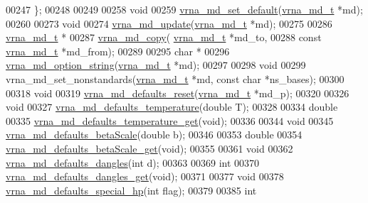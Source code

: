 \begin{DoxyCode}
00247 \};
00248 
00249 
00258 \textcolor{keywordtype}{void}
00259 \hyperlink{group__model__details_ga8ac6ff84936282436f822644bf841f66}{vrna\_md\_set\_default}(\hyperlink{structvrna__md__s}{vrna\_md\_t} *md);
00260 
00273 \textcolor{keywordtype}{void}
00274 \hyperlink{group__model__details_ga36ae40b8c3b82362f5798ad5b047b814}{vrna\_md\_update}(\hyperlink{structvrna__md__s}{vrna\_md\_t} *md);
00275 
00286 \hyperlink{structvrna__md__s}{vrna\_md\_t} *
00287 \hyperlink{group__model__details_ga619057a740918b5fb01808362bb67aea}{vrna\_md\_copy}( \hyperlink{structvrna__md__s}{vrna\_md\_t}       *md\_to,
00288               \textcolor{keyword}{const} \hyperlink{structvrna__md__s}{vrna\_md\_t} *md\_from);
00289 
00295 \textcolor{keywordtype}{char} *
00296 \hyperlink{group__model__details_ga3a7469f0725a849af6ba61a57dfd60ce}{vrna\_md\_option\_string}(\hyperlink{structvrna__md__s}{vrna\_md\_t}  *md);
00297 
00298 \textcolor{keywordtype}{void}
00299 vrna\_md\_set\_nonstandards(\hyperlink{structvrna__md__s}{vrna\_md\_t} *md, \textcolor{keyword}{const} \textcolor{keywordtype}{char} *ns\_bases);
00300 
00318 \textcolor{keywordtype}{void}
00319 \hyperlink{group__model__details_ga70834424cf804d149937de89f80ceb45}{vrna\_md\_defaults\_reset}(\hyperlink{structvrna__md__s}{vrna\_md\_t} *md\_p);
00320 
00326 \textcolor{keywordtype}{void}
00327 \hyperlink{group__model__details_gaf9e527e9a2f7e6fd6e42bc6e602f5445}{vrna\_md\_defaults\_temperature}(\textcolor{keywordtype}{double} T);
00328 
00334 \textcolor{keywordtype}{double}
00335 \hyperlink{group__model__details_ga96b24a74437f9ba46c4e06343155bf46}{vrna\_md\_defaults\_temperature\_get}(\textcolor{keywordtype}{void});
00336 
00344 \textcolor{keywordtype}{void}
00345 \hyperlink{group__model__details_gae984567db36c3f9b8731ecc917abf3a2}{vrna\_md\_defaults\_betaScale}(\textcolor{keywordtype}{double} b);
00346 
00353 \textcolor{keywordtype}{double}
00354 \hyperlink{group__model__details_gabb8780f5410c52f970d75b044059bd09}{vrna\_md\_defaults\_betaScale\_get}(\textcolor{keywordtype}{void});
00355 
00361 \textcolor{keywordtype}{void}
00362 \hyperlink{group__model__details_gac76a5374def8e5e4e644ff6e4cc72dee}{vrna\_md\_defaults\_dangles}(\textcolor{keywordtype}{int} d);
00363 
00369 \textcolor{keywordtype}{int}
00370 \hyperlink{group__model__details_ga67ca06f95ae133778c79a4493c9817b8}{vrna\_md\_defaults\_dangles\_get}(\textcolor{keywordtype}{void});
00371 
00377 \textcolor{keywordtype}{void}
00378 \hyperlink{group__model__details_gafff6449a02744add0308e653230c15fc}{vrna\_md\_defaults\_special\_hp}(\textcolor{keywordtype}{int} flag);
00379 
00385 \textcolor{keywordtype}{int}

\end{DoxyCode}
